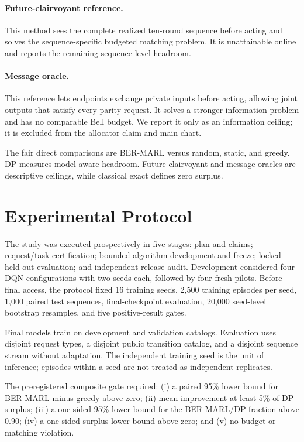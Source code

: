 \documentclass[10pt,twocolumn]{article}
\newcommand{\method}{\textsc{BER-MARL}}
\begin{document}
\paragraph{Future-clairvoyant reference.}
This method sees the complete realized ten-round sequence before acting and solves the sequence-specific budgeted matching problem. It is unattainable online and reports the remaining sequence-level headroom.

\paragraph{Message oracle.}
This reference lets endpoints exchange private inputs before acting, allowing joint outputs that satisfy every parity request. It solves a stronger-information problem and has no comparable Bell budget. We report it only as an information ceiling; it is excluded from the allocator claim and main chart.

The fair direct comparisons are \method{} versus random, static, and greedy. DP measures model-aware headroom. Future-clairvoyant and message oracles are descriptive ceilings, while classical exact defines zero surplus.

\section{Experimental Protocol}
The study was executed prospectively in five stages: plan and claims; request/task certification; bounded algorithm development and freeze; locked held-out evaluation; and independent release audit. Development considered four DQN configurations with two seeds each, followed by four fresh pilots. Before final access, the protocol fixed 16 training seeds, 2,500 training episodes per seed, 1,000 paired test sequences, final-checkpoint evaluation, 20,000 seed-level bootstrap resamples, and five positive-result gates.

Final models train on development and validation catalogs. Evaluation uses disjoint request types, a disjoint public transition catalog, and a disjoint sequence stream without adaptation. The independent training seed is the unit of inference; episodes within a seed are not treated as independent replicates.

The preregistered composite gate required: (i) a paired 95\% lower bound for \method-minus-greedy above zero; (ii) mean improvement at least 5\% of DP surplus; (iii) a one-sided 95\% lower bound for the \method/DP fraction above 0.90; (iv) a one-sided surplus lower bound above zero; and (v) no budget or matching violation.
\end{document}
